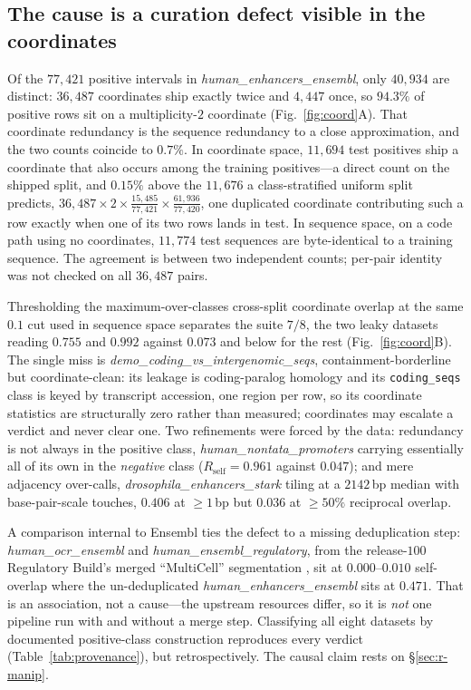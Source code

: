 \documentclass[webpdf,modern,large,namedate]{oup-authoring-template}%
\begin{document}
\subsection{The cause is a curation defect visible in the coordinates}\label{sec:r-coord}
Of the $77{,}421$ positive intervals in \textit{human\_enhancers\_ensembl}, only $40{,}934$ are distinct: $36{,}487$ coordinates ship exactly twice and $4{,}447$ once, so $94.3\%$ of positive rows sit on a multiplicity-$2$ coordinate (Fig.~\ref{fig:coord}A). That coordinate redundancy is the sequence redundancy to a close approximation, and the two counts coincide to $0.7\%$. In coordinate space, $11{,}694$ test positives ship a coordinate that also occurs among the training positives---a direct count on the shipped split, and $0.15\%$ above the $11{,}676$ a class-stratified uniform split predicts, $36{,}487\times2\times\tfrac{15{,}485}{77{,}421}\times\tfrac{61{,}936}{77{,}420}$, one duplicated coordinate contributing such a row exactly when one of its two rows lands in test. In sequence space, on a code path using no coordinates, $11{,}774$ test sequences are byte-identical to a training sequence. The agreement is between two independent counts; per-pair identity was not checked on all $36{,}487$ pairs.

Thresholding the maximum-over-classes cross-split coordinate overlap at the same $0.1$ cut used in sequence space separates the suite $7/8$, the two leaky datasets reading $0.755$ and $0.992$ against $0.073$ and below for the rest (Fig.~\ref{fig:coord}B). The single miss is \textit{demo\_coding\_vs\_intergenomic\_seqs}, containment-borderline but coordinate-clean: its leakage is coding-paralog homology and its \texttt{coding\_seqs} class is keyed by transcript accession, one region per row, so its coordinate statistics are structurally zero rather than measured; coordinates may escalate a verdict and never clear one. Two refinements were forced by the data: redundancy is not always in the positive class, \textit{human\_nontata\_promoters} carrying essentially all of its own in the \emph{negative} class ($R_{\mathrm{self}}=0.961$ against $0.047$); and mere adjacency over-calls, \textit{drosophila\_enhancers\_stark} tiling at a $2142$\,bp median with base-pair-scale touches, $0.406$ at ${\ge}1$\,bp but $0.036$ at $\ge50\%$ reciprocal overlap.

A comparison internal to Ensembl ties the defect to a missing deduplication step: \textit{human\_ocr\_ensembl} and \textit{human\_ensembl\_regulatory}, from the release-$100$ Regulatory Build's merged ``MultiCell'' segmentation \citep{zerbino2015regbuild}, sit at $0.000$--$0.010$ self-overlap where the un-deduplicated \textit{human\_enhancers\_ensembl} sits at $0.471$. That is an association, not a cause---the upstream resources differ, so it is \emph{not} one pipeline run with and without a merge step. Classifying all eight datasets by documented positive-class construction reproduces every verdict (Table~\ref{tab:provenance}), but retrospectively. The causal claim rests on \S\ref{sec:r-manip}.
\end{document}
